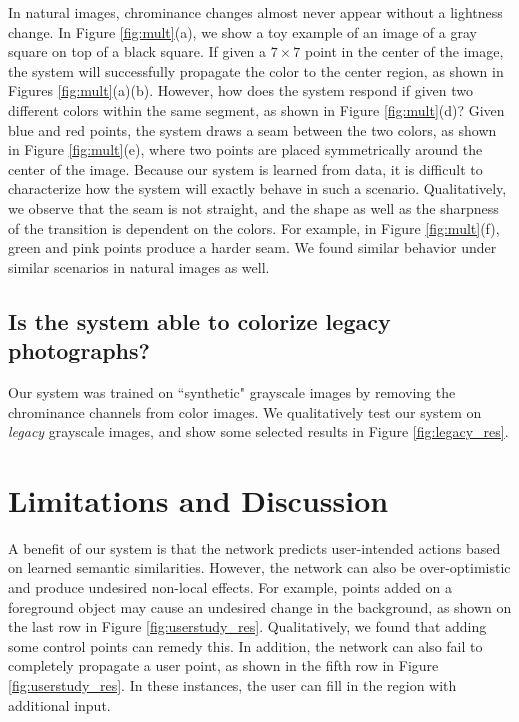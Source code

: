 \documentclass[acmtog,authorversion]{acmart}
\begin{document}
In natural images, chrominance changes almost never appear without a lightness change. In Figure \ref{fig:mult}(a), we show a toy example of an image of a gray square on top of a black square. If given a $7\times 7$ point in the center of the image, the system will successfully propagate the color to the center region, as shown in Figures \ref{fig:mult}(a)(b). However, how does the system respond if given two different colors within the same segment, as shown in Figure \ref{fig:mult}(d)? Given blue and red points, the system draws a seam between the two colors, as shown in Figure \ref{fig:mult}(e), where two points are placed symmetrically around the center of the image. Because our system is learned from data, it is difficult to characterize how the system will exactly behave in such a scenario. Qualitatively, we observe that the seam is not straight, and the shape as well as the sharpness of the transition is dependent on the colors. For example, in Figure \ref{fig:mult}(f), green and pink points produce a harder seam. We found similar behavior under similar scenarios in natural images as well.

\subsection{Is the system able to colorize legacy photographs?}
\label{sec:legacy}

Our system was trained on ``synthetic" grayscale images by removing the chrominance channels from color images. We qualitatively test our system on \textit{legacy} grayscale images, and show some selected results in Figure \ref{fig:legacy_res}.
 \section{Limitations and Discussion}

A benefit of our system is that the network predicts user-intended actions based on learned semantic similarities. However, the network can also be over-optimistic and produce undesired non-local effects. For example, points added on a foreground object may cause an undesired change in the background, as shown on the last row in Figure \ref{fig:userstudy_res}. Qualitatively, we found that adding some control points can remedy this. In addition, the network can also fail to completely propagate a user point, as shown in the fifth row in Figure \ref{fig:userstudy_res}. In these instances, the user can fill in the region with additional input.
\end{document}
